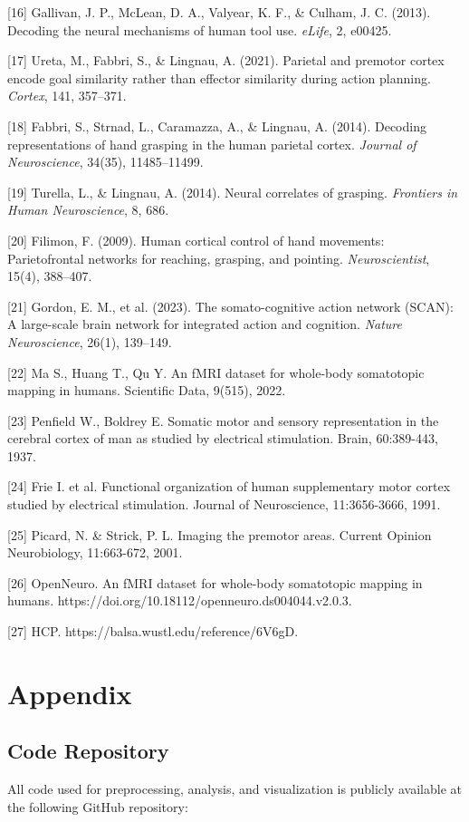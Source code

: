 \documentclass{article}
\begin{document}
[16] Gallivan, J. P., McLean, D. A., Valyear, K. F., \& Culham, J. C. (2013). Decoding the neural mechanisms of human tool use. \textit{eLife}, 2, e00425.

[17] Ureta, M., Fabbri, S., \& Lingnau, A. (2021). Parietal and premotor cortex encode goal similarity rather than effector similarity during action planning. \textit{Cortex}, 141, 357–371.

[18] Fabbri, S., Strnad, L., Caramazza, A., \& Lingnau, A. (2014). Decoding representations of hand grasping in the human parietal cortex. \textit{Journal of Neuroscience}, 34(35), 11485–11499.

[19] Turella, L., \& Lingnau, A. (2014). Neural correlates of grasping. \textit{Frontiers in Human Neuroscience}, 8, 686.

[20] Filimon, F. (2009). Human cortical control of hand movements: Parietofrontal networks for reaching, grasping, and pointing. \textit{Neuroscientist}, 15(4), 388–407.

[21] Gordon, E. M., et al. (2023). The somato-cognitive action network (SCAN): A large-scale brain network for integrated action and cognition. \textit{Nature Neuroscience}, 26(1), 139–149.

[22] Ma S., Huang T., Qu Y. An fMRI dataset for whole-body somatotopic mapping in humans. Scientific Data, 9(515), 2022.

[23] Penfield W., Boldrey E. Somatic motor and sensory representation in the cerebral cortex of man as studied by electrical stimulation. Brain, 60:389-443, 1937.

[24] Frie I. et al. Functional organization of human supplementary motor cortex studied by electrical stimulation. Journal of Neuroscience, 11:3656-3666, 1991.

[25] Picard, N. \& Strick, P. L. Imaging the premotor areas. Current Opinion Neurobiology, 11:663-672, 2001.

[26] OpenNeuro. An fMRI dataset for whole-body somatotopic mapping in humans. https://doi.org/10.18112/openneuro.ds004044.v2.0.3.

[27] HCP. https://balsa.wustl.edu/reference/6V6gD.


\appendix
\section*{Appendix}

\subsection*{Code Repository}
All code used for preprocessing, analysis, and visualization is publicly available at the following GitHub repository:
\end{document}
